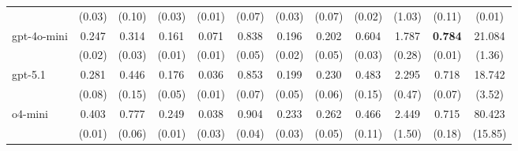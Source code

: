 \begin{table}[ht]
{\begin{tabular}{l cccc cccc cc c}
                                           & (0.03)                                          & (0.10)                                       & (0.03)                                        & (0.01)                  & (0.07)           & (0.03)         & (0.07)         & (0.02)         & (1.03)          & (0.11)         & (0.01)            \\
            \addlinespace[0.2em]
            gpt-4o-mini                    & {0.247}                                         & {0.314}                                      & {0.161}                                       & {0.071}                 & {0.838}          & {0.196}        & {0.202}        & {0.604}        & {1.787}         & \textbf{0.784} & 21.084            \\
                                           & (0.02)                                          & (0.03)                                       & (0.01)                                        & (0.01)                  & (0.05)           & (0.02)         & (0.05)         & (0.03)         & (0.28)          & (0.01)         & (1.36)            \\

            \addlinespace[0.2em]
            gpt-5.1                        & {0.281}                                         & 0.446                                        & {0.176}                                       & {0.036}                 & {0.853}          & {0.199}        & {0.230}        & {0.483}        & {2.295}         & {0.718}        & 18.742            \\
                                           & (0.08)                                          & (0.15)                                       & (0.05)                                        & (0.01)                  & (0.07)           & (0.05)         & (0.06)         & (0.15)         & (0.47)          & (0.07)         & (3.52)            \\
            \addlinespace[0.2em]
            o4-mini                        & 0.403                                           & 0.777                                        & {0.249}                                       & {0.038}                 & {0.904}          & {0.233}        & {0.262}        & 0.466          & {2.449}         & {0.715}        & 80.423            \\
                                           & (0.01)                                          & (0.06)                                       & (0.01)                                        & (0.03)                  & (0.04)           & (0.03)         & (0.05)         & (0.11)         & (1.50)          & (0.18)         & (15.85)           \\


\end{tabular}}
\end{table}
